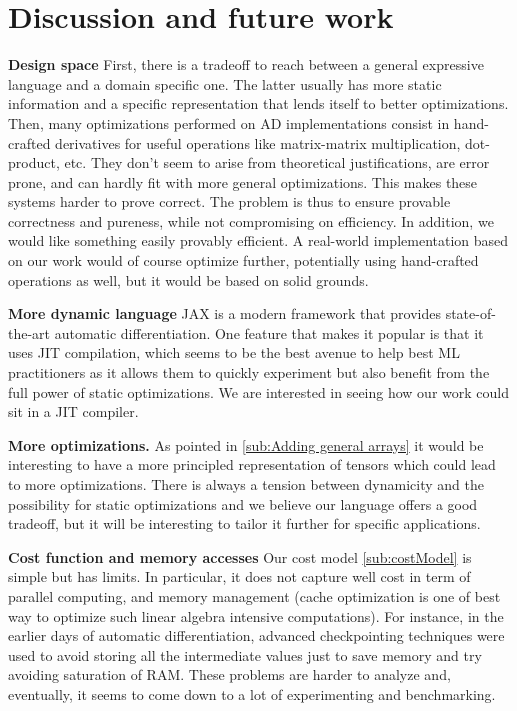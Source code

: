 \section{Discussion and future work} %
\label{sec:discussion_and_future_work}

\noindent \textbf{Design space}
First, there is a tradeoff to reach between a general expressive language and a domain specific one. The latter usually has more static information and a specific representation that lends itself to better optimizations.
Then, many optimizations performed on AD implementations consist in hand-crafted derivatives for useful operations like matrix-matrix multiplication, dot-product, etc.
They don't seem to arise from theoretical justifications, are error prone, and can hardly fit with more general optimizations.
This makes these systems harder to prove correct. The problem is thus to ensure provable correctness and pureness, while not compromising on efficiency. In addition, we would like something easily provably efficient. 
A real-world implementation based on our work would of course optimize further, potentially using hand-crafted operations as well, but it would be based on solid grounds.

\noindent \textbf{More dynamic language}
JAX \cite{bradbury2020jax,frostig2018compiling} is a modern framework that provides state-of-the-art automatic differentiation. 
One feature that makes it popular is that it uses JIT compilation, 
which seems to be the best avenue to help best ML practitioners as it allows them 
to quickly experiment but also benefit from the full power of static optimizations.
We are interested in seeing how our work could sit in a JIT compiler. 

\noindent \textbf{More optimizations.}
As pointed in \ref{sub:Adding general arrays} it would be interesting to have a more principled representation 
of tensors which could lead to more optimizations. 
There is always a tension between dynamicity and the possibility for static optimizations 
and we believe our language offers a good tradeoff, but it will be interesting to tailor it 
further for specific applications.

\noindent \textbf{Cost function and memory accesses}
Our cost model \ref{sub:costModel} is simple but has limits. 
In particular, it does not capture well cost in term of
parallel computing, and memory management (cache optimization is one of best way to optimize such linear algebra intensive computations).
For instance, in the earlier days of automatic differentiation, 
advanced checkpointing techniques were used to avoid storing all the intermediate values just to save memory 
and try avoiding saturation of RAM. 
These problems are harder to analyze and, eventually, it seems to come down to a lot of experimenting and benchmarking.

